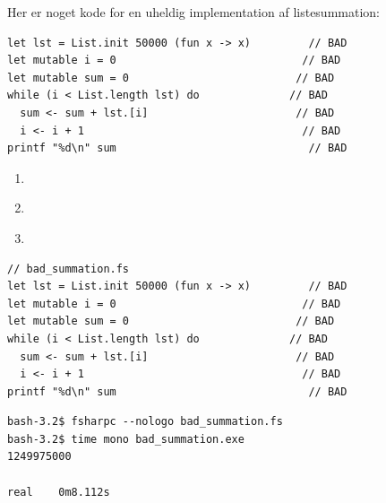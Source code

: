 \documentclass[rgb]{beamer}
\begin{document}
\begin{frame}[fragile]
\begin{footnotesize}

  \vspace{1ex}

  Her er noget kode for en uheldig implementation af listesummation:
  \vspace{1ex}

\begin{lstlisting}[numbers=none,frame=none]
let lst = List.init 50000 (fun x -> x)         // BAD
let mutable i = 0                             // BAD
let mutable sum = 0                          // BAD
while (i < List.length lst) do              // BAD
  sum <- sum + lst.[i]                       // BAD
  i <- i + 1                                  // BAD
printf "%d\n" sum                              // BAD
\end{lstlisting}

\vspace{1ex}
\vspace{1ex}

  \begin{enumerate}
  \item \underline{\hspace{10cm}}  %
  \item \underline{\hspace{10cm}}  %
  \item \underline{\hspace{10cm}}  %
\end{enumerate}
\end{footnotesize}

\end{frame}


\begin{frame}[fragile]
\begin{footnotesize}


\begin{lstlisting}[numbers=none,frame=none]
// bad_summation.fs
let lst = List.init 50000 (fun x -> x)         // BAD
let mutable i = 0                             // BAD
let mutable sum = 0                          // BAD
while (i < List.length lst) do              // BAD
  sum <- sum + lst.[i]                       // BAD
  i <- i + 1                                  // BAD
printf "%d\n" sum                              // BAD
\end{lstlisting}


\begin{verbatim}
bash-3.2$ fsharpc --nologo bad_summation.fs
bash-3.2$ time mono bad_summation.exe
1249975000

real	0m8.112s
\end{verbatim}

\end{footnotesize}
\end{frame}
\end{document}
